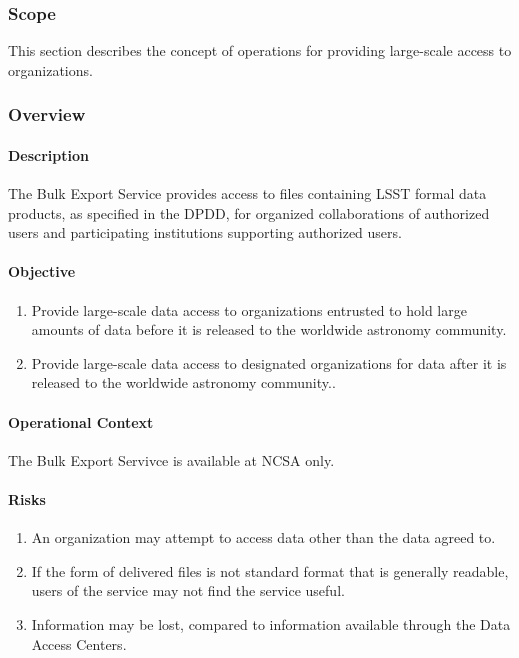 \subsubsection{Scope}
This section describes the concept of operations for providing large-scale access to organizations.

\subsubsection{Overview}

\paragraph{Description}

The Bulk Export Service provides access to files containing LSST formal data products, as specified in the DPDD, for organized collaborations of authorized users and
participating institutions supporting authorized users.

\paragraph{Objective}

\begin{enumerate}

\item Provide large-scale data access to organizations entrusted to hold large
amounts of data before it is released to the worldwide astronomy community.

\item Provide large-scale data access to designated organizations for data after
it is released to the worldwide astronomy community..

\end{enumerate}

\paragraph{Operational Context}
The Bulk Export Servivce is available at NCSA only.

\paragraph{Risks}

\begin{enumerate}

\item An organization may attempt to access data other than the data agreed to.

\item If the form of delivered files is not standard format that is generally readable, users of the service may not find the
service useful.

\item Information may be lost, compared to information available through the Data Access Centers.

\end{enumerate}

